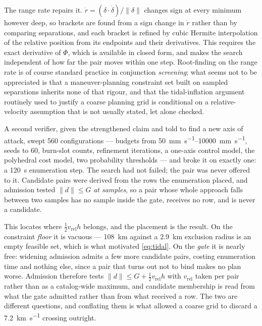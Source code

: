 The range rate repairs it. $\dot r = (\delta \cdot \dot\delta)/\lVert\delta\rVert$
changes sign at every minimum however deep, so brackets are found from a sign
change in $\dot r$ rather than by comparing separations, and each bracket is
refined by cubic Hermite interpolation of the relative position from its
endpoints and their derivatives. This requires the exact derivative of $\Phi$,
which is available in closed form, and makes the search independent of how far
the pair moves within one step. Root-finding on the range rate is of course
standard practice in conjunction \emph{screening}; what seems not to be
appreciated is that a maneuver-planning constraint set built on sampled
separations inherits none of that rigour, and that the tidal-inflation argument
routinely used to justify a coarse planning grid is conditional on a
relative-velocity assumption that is not usually stated, let alone checked.

A second verifier, given the strengthened claim and told to find a new axis of
attack, swept \num{560} configurations --- budgets from \SIrange{50}{10000}{\milli\meter\per\second},
seeds to \num{60}, burn-slot counts, refinement iterations, a one-axis control
model, the polyhedral cost model, two probability thresholds --- and broke it on
exactly one: a \SI{120}{\second} enumeration step. The search had not failed;
the pair was never offered to it. Candidate pairs were derived from the rows the
enumeration placed, and admission tested $\lVert d \rVert \le G$ \emph{at
samples}, so a pair whose whole approach falls between two samples has no sample
inside the gate, receives no row, and is never a candidate.

This locates where $\tfrac12 v_{\text{rel}} h$ belongs, and the placement is the
result. On the constraint \emph{floor} it is vacuous --- \SI{108}{\kilo\meter}
against a \SI{2.9}{\kilo\meter} exclusion radius is an empty feasible set, which
is what motivated \eqref{eq:tidal}. On the \emph{gate} it is nearly free:
widening admission admits a few more candidate pairs, costing enumeration time
and nothing else, since a pair that turns out not to bind makes no plan worse.
Admission therefore tests $\lVert d \rVert \le G + \tfrac12 v_{\text{rel}} h$
with $v_{\text{rel}}$ taken per pair rather than as a catalog-wide maximum, and
candidate membership is read from what the gate admitted rather than from what
received a row. The two are different questions, and conflating them is what
allowed a coarse grid to discard a \SI{7.2}{\kilo\meter\per\second} crossing
outright.

